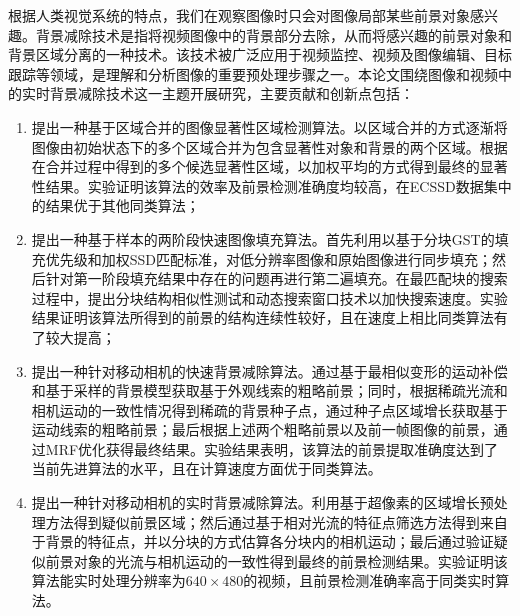 \begin{cabstract}
根据人类视觉系统的特点，我们在观察图像时只会对图像局部某些前景对象感兴趣。背景减除技术是指将视频图像中的背景部分去除，从而将感兴趣的前景对象和背景区域分离的一种技术。该技术被广泛应用于视频监控、视频及图像编辑、目标跟踪等领域，是理解和分析图像的重要预处理步骤之一。本论文围绕图像和视频中的实时背景减除技术这一主题开展研究，主要贡献和创新点包括：
\begin{enumerate}
  \item 提出一种基于区域合并的图像显著性区域检测算法。以区域合并的方式逐渐将图像由初始状态下的多个区域合并为包含显著性对象和背景的两个区域。根据在合并过程中得到的多个候选显著性区域，以加权平均的方式得到最终的显著性结果。实验证明该算法的效率及前景检测准确度均较高，在ECSSD数据集中的结果优于其他同类算法；

  \item 提出一种基于样本的两阶段快速图像填充算法。首先利用以基于分块GST的填充优先级和加权SSD匹配标准，对低分辨率图像和原始图像进行同步填充；然后针对第一阶段填充结果中存在的问题再进行第二遍填充。在最匹配块的搜索过程中，提出分块结构相似性测试和动态搜索窗口技术以加快搜索速度。实验结果证明该算法所得到的前景的结构连续性较好，且在速度上相比同类算法有了较大提高；
  \item 提出一种针对移动相机的快速背景减除算法。通过基于最相似变形的运动补偿和基于采样的背景模型获取基于外观线索的粗略前景；同时，根据稀疏光流和相机运动的一致性情况得到稀疏的背景种子点，通过种子点区域增长获取基于运动线索的粗略前景；最后根据上述两个粗略前景以及前一帧图像的前景，通过MRF优化获得最终结果。实验结果表明，该算法的前景提取准确度达到了当前先进算法的水平，且在计算速度方面优于同类算法。
  \item 提出一种针对移动相机的实时背景减除算法。利用基于超像素的区域增长预处理方法得到疑似前景区域；然后通过基于相对光流的特征点筛选方法得到来自于背景的特征点，并以分块的方式估算各分块内的相机运动；最后通过验证疑似前景对象的光流与相机运动的一致性得到最终的前景检测结果。实验证明该算法能实时处理分辨率为$640 \times 480$的视频，且前景检测准确率高于同类实时算法。
\end{enumerate}

\end{cabstract}


